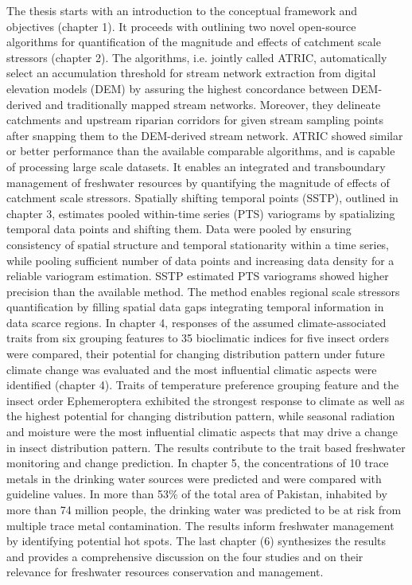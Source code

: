 The thesis starts with an introduction to the conceptual framework and objectives (chapter 1). It proceeds with outlining two novel open-source algorithms for quantification of the magnitude and effects of catchment scale stressors (chapter 2). The algorithms, i.e. jointly called ATRIC, automatically select an accumulation threshold for stream network extraction from digital elevation models (DEM) by assuring the highest concordance between DEM-derived and traditionally mapped stream networks. Moreover, they delineate catchments and upstream riparian corridors for given stream sampling points after snapping them to the DEM-derived stream network. ATRIC showed similar or better performance than the available comparable algorithms, and is capable of processing large scale datasets. It enables an integrated and transboundary management of freshwater resources by quantifying the magnitude of effects of catchment scale stressors. Spatially shifting temporal points (SSTP), outlined in chapter 3, estimates pooled within-time series (PTS) variograms by spatializing temporal data points and shifting them. Data were pooled by ensuring consistency of spatial structure and temporal stationarity within a time series, while pooling sufficient number of data points and increasing data density for a reliable variogram estimation. SSTP estimated PTS variograms showed higher precision than the available method. The method enables regional scale stressors quantification by filling spatial data gaps integrating temporal information in data scarce regions. In chapter 4, responses of the assumed climate-associated traits from six grouping features to 35 bioclimatic indices for five insect orders were compared, their potential for changing distribution pattern under future climate change was evaluated and the most influential climatic aspects were identified (chapter 4). Traits of temperature preference grouping feature and the insect order Ephemeroptera exhibited the strongest response to climate as well as the highest potential for changing distribution pattern, while seasonal radiation and moisture were the most influential climatic aspects that may drive a change in insect distribution pattern. The results contribute to the trait based freshwater monitoring and change prediction. In chapter 5, the concentrations of 10 trace metals in the drinking water sources were predicted and were compared with guideline values. In more than 53\% of the total area of Pakistan, inhabited by more than 74 million people, the drinking water was predicted to be at risk from multiple trace metal contamination. The results inform freshwater management by identifying potential hot spots. The last chapter (6) synthesizes the results and provides a comprehensive discussion on the four studies and on their relevance for freshwater resources conservation and management.
